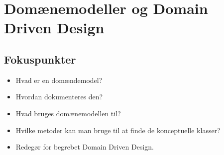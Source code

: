 \section{Domænemodeller og Domain Driven Design}

\subsection{Fokuspunkter}

\begin{itemize}
	\item Hvad er en domændemodel?
	\item Hvordan dokumenteres den?
	\item Hvad bruges domænemodellen til?
	\item Hvilke metoder kan man bruge til at finde de konceptuelle klasser?
	\item Redegør for begrebet Domain Driven Design.
\end{itemize}